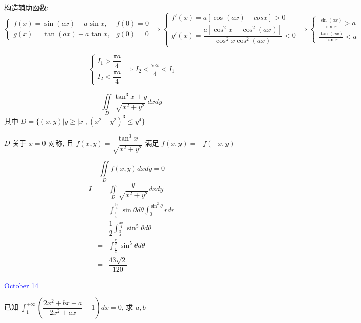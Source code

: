 \begin{solution}

	构造辅助函数: 
	$$\begin{cases}
		f(x) = \sin(ax) - a\sin x, & f(0) = 0 \\
		g(x) = \tan(ax) - a\tan x, & g(0) = 0
	\end{cases}\Rightarrow 
	\begin{cases} 
		f'(x) = a[\cos(ax) - cos x] > 0\\
		g'(x) = \dfrac{a[\cos^{2}x-\cos^{2}(ax)]}{\cos^{2}x\cos^{2}(ax)} < 0
	\end{cases}\Rightarrow 
	\begin{cases}
		\frac{\sin(ax)}{\sin x} > a\\
		\frac{\tan(ax)}{\tan x} < a
	\end{cases}$$
	
	$$\begin{cases}
		I_{1} > \dfrac{\pi a}{4}\\
		I_{2} < \dfrac{\pi a}{4}
	\end{cases}\Rightarrow I_{2} < \dfrac{\pi a}{4} < I_{1}$$
\end{solution}

\begin{example}[][Exam: 36.2.12]
	$$\iint\limits_{D}\dfrac{\tan^3x+y}{\sqrt{x^2+y^2}}dxdy$$
	其中 $D=\{(x,y)|y\geq |x|,(x^2+y^2)^3\leq y^4\}$
\end{example}


\begin{solution}
	$D$ 关于 $x = 0$ 对称, 且 $f(x,y) = \dfrac{\tan^{3}x}{\sqrt{x^{2}+y^{2}}}$ 满足 $f(x,y) = -f(-x,y)$
	
	$$\displaystyle{\iint\limits_{D}f(x,y)dxdy} = 0$$  
	\begin{eqnarray*}
		I & = & \iint\limits_{D}\dfrac{y}{\sqrt{x^2+y^2}}dxdy\\
		  & = & \int_{\frac{\pi}{4}}^{\frac{3\pi}{4}}\sin\theta d\theta\int_{0}^{\sin^{2}\theta}r dr\\
		  & = & \dfrac{1}{2}\int_{\frac{\pi}{4}}^{\frac{3\pi}{4}}\sin^5\theta d\theta\\
		  & = & \int_{\frac{\pi}{4}}^{\frac{\pi}{2}}\sin^5\theta d\theta\\
		  & = & \dfrac{43\sqrt{2}}{120}
	\end{eqnarray*}
\end{solution}


\textcolor{blue}{October 14}

\begin{example}[][Exam: 36.2.13]
	已知 $\displaystyle{\int_{1}^{+\infty}\left( \dfrac{2x^2+bx+a}{2x^2+ax}-1\right)dx=0}$, 求 $a,b$
\end{example}

